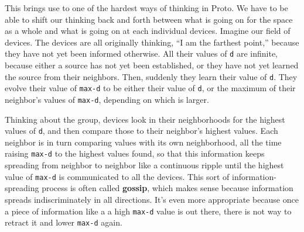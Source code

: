 \documentclass{article}
\newcommand\var[1]{{\tt #1}}
\begin{document}
This brings use to one of the hardest ways of thinking in Proto.  We
have to be able to shift our thinking back and forth between what is
going on for the space as a whole and what is going on at each
individual devices.  Imagine our field of devices. The devices are all
originally thinking, ``I am the farthest point,'' because they have
not yet been informed otherwise.  All their values of \var{d} are
infinite, because either a source has not yet been established, or
they have not yet learned the source from their neighbors.  Then,
suddenly they learn their value of \var{d}.  They evolve their value
of \var{max-d} to be either their value of \var{d}, or the maximum of
their neighbor's values of \var{max-d}, depending on which is larger.

Thinking about the group, devices look in their neighborhoods for the
highest values of \var{d}, and then compare those to their neighbor's
highest values.  Each neighbor is in turn comparing values with its
own neighborhood, all the time raising \var{max-d} to the highest
values found, so that this information keeps spreading from neighbor
to neighbor like a continuous ripple until the highest value of
\var{max-d} is communicated to all the devices.  This sort of
information-spreading process is often called {\bf gossip}, which
makes sense because information spreads indiscriminately in all
directions.  It's even more appropriate because once a piece of
information like a a high \var{max-d} value is out there, there is not
way to retract it and lower \var{max-d} again.
\end{document}
